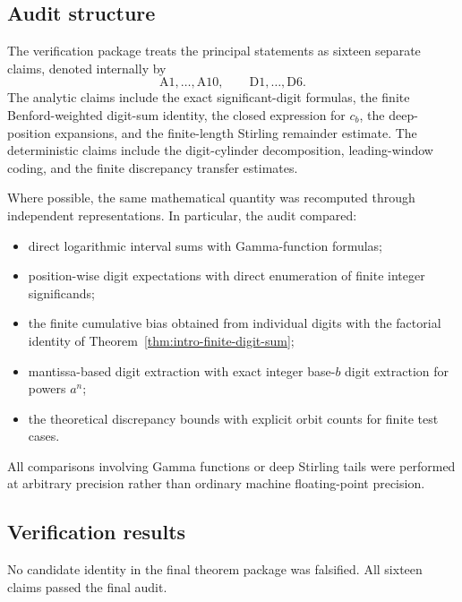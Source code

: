 \documentclass[11pt]{article}
\theoremstyle{definition}
\theoremstyle{remark}
\begin{document}
\subsection{Audit structure}
\label{subsec:audit-structure}

The verification package treats the principal statements as sixteen
separate claims, denoted internally by
\[
    \mathrm{A1},\ldots,\mathrm{A10},
    \qquad
    \mathrm{D1},\ldots,\mathrm{D6}.
\]
The analytic claims include the exact significant-digit formulas, the
finite Benford-weighted digit-sum identity, the closed expression for
\(c_b\), the deep-position expansions, and the finite-length Stirling
remainder estimate.  The deterministic claims include the digit-cylinder
decomposition, leading-window coding, and the finite discrepancy
transfer estimates.

Where possible, the same mathematical quantity was recomputed through
independent representations.  In particular, the audit compared:

\begin{itemize}
    \item direct logarithmic interval sums with Gamma-function formulas;

    \item position-wise digit expectations with direct enumeration of
    finite integer significands;

    \item the finite cumulative bias obtained from individual digits
    with the factorial identity of
    Theorem~\ref{thm:intro-finite-digit-sum};

    \item mantissa-based digit extraction with exact integer base-\(b\)
    digit extraction for powers \(a^n\);

    \item the theoretical discrepancy bounds with explicit orbit
    counts for finite test cases.
\end{itemize}

All comparisons involving Gamma functions or deep Stirling tails were
performed at arbitrary precision rather than ordinary machine
floating-point precision.


\subsection{Verification results}
\label{subsec:verification-results}

No candidate identity in the final theorem package was falsified.
All sixteen claims passed the final audit.
\end{document}
